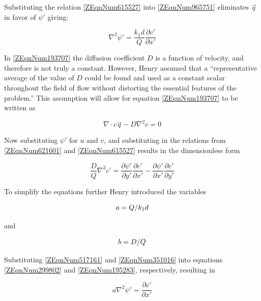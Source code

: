 \documentclass{article}
\newcommand{\pderiv}[2]{\frac{\partial #1}{\partial #2}} %
\newcommand{\spbox}[1]{ \text{ #1 }} %
\begin{document}
Substituting the relation \eqref{ZEqnNum615527} into \eqref{ZEqnNum965751}
eliminates $\stackrel{\rightharpoonup}{q}$ in favor of $\psi '$ giving:

\begin{equation} \label{ZEqnNum299802} \nabla ^{2} \psi '=\frac{k_{1} d}{Q}
\pderiv{c'}{x'} \end{equation}

 In \eqref{ZEqnNum193707} the diffusion coefficient $D$ is a function of
 velocity, and therefore is not truly a constant. However, Henry \cite{Henry60}
 assumed that a ``representative average of the value of $D$ could be found and
 used as a constant scalar throughout the field of flow without distorting the
 essential features of the problem.'' This assumption will allow for equation
 \eqref{ZEqnNum193707} to be written as

\begin{equation} \label{2.15)} \nabla \cdot
c\stackrel{\rightharpoonup}{q}-D\nabla ^{2} c=0 \end{equation}

Now substituting $\psi '\spbox{for} u\spbox{and} v$, and substituting in the relations
from \eqref{ZEqnNum621601} and \eqref{ZEqnNum615527} results in the
dimensionless form

\begin{equation} \label{ZEqnNum195283} 
    \frac{D}{Q} \nabla ^{2} c'=\pderiv{\psi'}{y'} 
    \pderiv{c'}{x'} -\pderiv{\psi'}{x'} 
    \pderiv{c'}{y'} 
\end{equation}

To simplify the equations further Henry introduced the variables 

\begin{equation} \label{ZEqnNum517161} 
    a={Q\mathord{\left/ {\vphantom {Q k_{1} d}} \right. \kern-\nulldelimiterspace} k_{1} d} 
\end{equation}

and 

\begin{equation} \label{ZEqnNum351016} 
    b={D\mathord{\left/ {\vphantom {D Q}} \right. \kern-\nulldelimiterspace} Q} 
\end{equation}

 Substituting \eqref{ZEqnNum517161} and \eqref{ZEqnNum351016} into equations
 \eqref{ZEqnNum299802} and \eqref{ZEqnNum195283}, respectively, resulting in

\begin{equation} \label{2.19)} 
    a\nabla ^{2} \psi '=\pderiv{c'}{x'} 
\end{equation}
\end{document}
